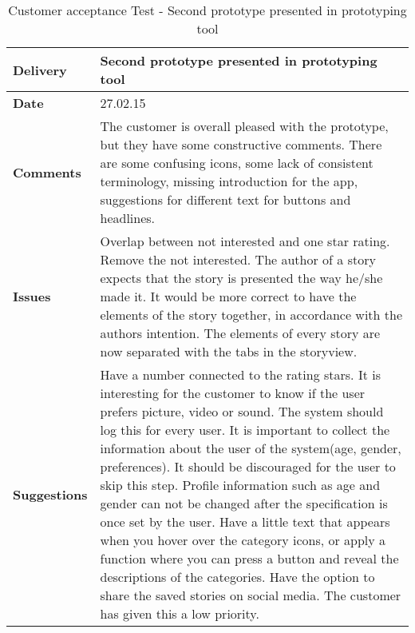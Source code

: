 \renewcommand{\arraystretch}{2}%
\begin{center}
	\begin{longtable}{ | p{4cm} | p{13cm} | }
		
		\caption[Customer acceptance test]{Customer acceptance Test - Second prototype presented in prototyping tool} \label{Tab:cattest2}\\
		\hline
		\textbf{Delivery} & Second prototype presented in prototyping tool\\ \hline
		\textbf{Date} & 27.02.15 \\ \hline 
		\textbf{Comments}&
		The customer is overall pleased with the prototype, but they have some constructive comments. 
		There are some confusing icons, some lack of consistent terminology, missing introduction for the app, suggestions for different text for buttons and headlines.
		\\ \hline
		\textbf{Issues} 	 &	
		Overlap between not interested and one star rating. Remove the not interested. The author of a story expects that the story is presented the way he/she made it. It would be more correct to have the elements of the story together, in accordance with the authors intention. The elements of every story are now separated with the tabs in the storyview. 	 	
		\\ \hline
		\textbf{Suggestions} &
		 Have a number connected to the rating stars. It is interesting for the customer to know if the user prefers picture, video or sound. The system should log this for every user. It is important to collect the information about the user of the system(age, gender, preferences). It should be discouraged for the user to skip this step. Profile information such as age and gender can not be changed after the specification is once set by the user. Have a little text that appears when you hover over the category icons, or apply a function where you can press a button and reveal the descriptions of the categories. Have the option to share the saved stories on social media. The customer has given this a low priority.
		\\ \hline
	\end{longtable}
\end{center}


